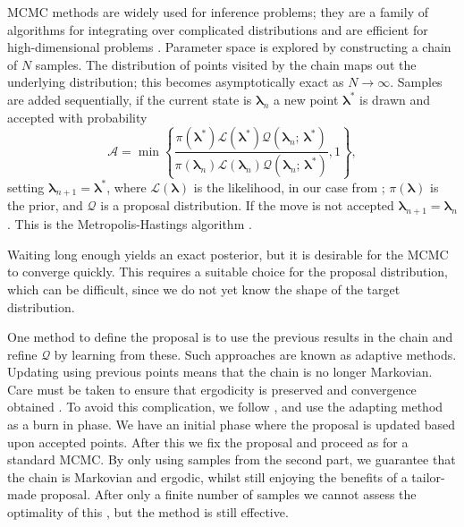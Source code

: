 MCMC methods are widely used for inference problems; they are a family of algorithms for integrating over complicated distributions and are efficient for high-dimensional problems \citep[chapter 29]{MacKay2003}. Parameter space is explored by constructing a chain of $N$ samples. The distribution of points visited by the chain maps out the underlying distribution; this becomes asymptotically exact as $N \rightarrow \infty$. Samples are added sequentially, if the current state is $\boldsymbol{\lambda}_n$ a new point $\boldsymbol{\lambda}^\ast$ is drawn and accepted with probability
\begin{equation}
\mathcal{A} = \min\left\{\frac{\pi(\boldsymbol{\lambda}^\ast)\mathcal{L}(\boldsymbol{\lambda}^\ast)\mathcal{Q}(\boldsymbol{\lambda}_n;\,\boldsymbol{\lambda}^\ast)}{\pi(\boldsymbol{\lambda}_n)\mathcal{L}(\boldsymbol{\lambda}_n)\mathcal{Q}(\boldsymbol{\lambda}_n;\,\boldsymbol{\lambda}^\ast)}, 1\right\},
\end{equation}
setting $\boldsymbol{\lambda}_{n + 1} = \boldsymbol{\lambda}^\ast$, where $\mathcal{L}(\boldsymbol{\lambda})$ is the likelihood, in our case from ; $\pi(\boldsymbol{\lambda})$ is the prior, and $\mathcal{Q}$ is a proposal distribution. If the move is not accepted  $\boldsymbol{\lambda}_{n + 1} = \boldsymbol{\lambda}_n$. This is the Metropolis-Hastings algorithm \citep{Metropolis1953,Hastings1970}.

Waiting long enough yields an exact posterior, but it is desirable for the MCMC to converge quickly. This requires a suitable choice for the proposal distribution, which can be difficult, since we do not yet know the shape of the target distribution.

One method to define the proposal is to use the previous results in the chain and refine $\mathcal{Q}$ by learning from these. Such approaches are known as adaptive methods. Updating using previous points means that the chain is no longer Markovian. Care must be taken to ensure that ergodicity is preserved and convergence obtained \citep{Roberts2007,Andrieu2008}. To avoid this complication, we follow \citet{Haario1999}, and use the adapting method as a burn in phase. We have an initial phase where the proposal is updated based upon accepted points. After this we fix the proposal and proceed as for a standard MCMC. By only using samples from the second part, we guarantee that the chain is Markovian and ergodic, whilst still enjoying the benefits of a tailor-made proposal. After only a finite number of samples we cannot assess the optimality of this \citep{Andrieu2008}, but the method is still effective.

